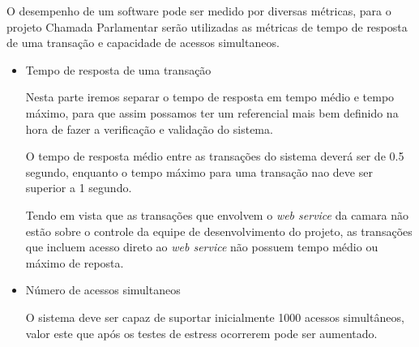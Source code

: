 



O desempenho de um software pode ser medido por diversas métricas, para o projeto Chamada Parlamentar serão utilizadas as métricas de tempo de resposta de uma transação e capacidade de acessos simultaneos.

\begin{itemize}

	\item{Tempo de resposta de uma transação}

		Nesta parte iremos separar o tempo de resposta em tempo médio e tempo máximo, para que assim possamos ter um referencial mais bem definido na hora de fazer a verificação e validação do sistema.

		O tempo de resposta médio entre as transações do sistema deverá ser de 0.5 segundo, enquanto o tempo máximo para uma transação nao deve ser superior a 1 segundo.

		Tendo em vista que as transações que envolvem o \textit{web service} da camara não estão sobre o controle da equipe de desenvolvimento do projeto, as transações que incluem acesso direto ao \textit{web service} não possuem tempo médio ou máximo de reposta.

	\item{Número de acessos simultaneos}

		O sistema deve ser capaz de suportar inicialmente 1000 acessos simultâneos, valor este que após os testes de estress ocorrerem pode ser aumentado.

\end{itemize}